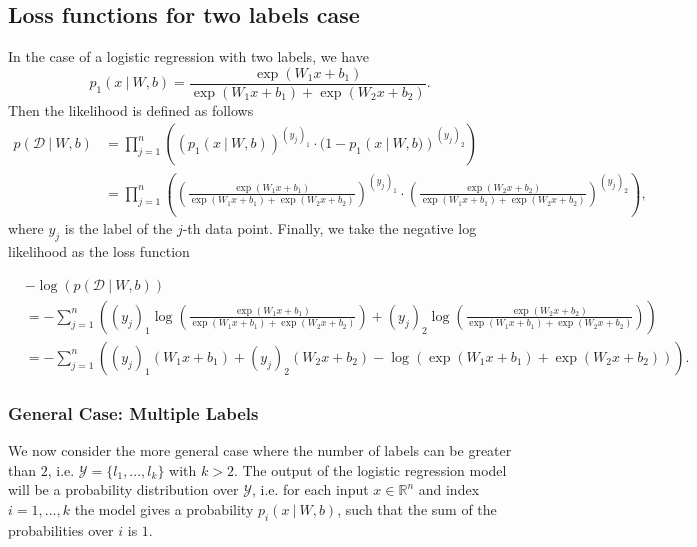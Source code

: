 \subsection*{Loss functions for two labels case}
In the case of a logistic regression with two labels, we have
\begin{equation}
p_1(x~|~W,b)  = \frac{\exp(W_{1}x + b_1)}{\exp(W_{1}x + b_1)+\exp(W_{2}x + b_2)}.
\end{equation}
Then the likelihood is defined as follows
\begin{equation}
\begin{split}
p(\mathcal{D}~|~W, b) &= 
\prod_{j = 1}^n 
\left(
\left(p_1(x~|~W,b)\right)^{(y_j)_1}\cdot(1-p_1\left(x~|~W,b)\right)^{(y_j)_2}
\right)
\\
&=
\prod_{j = 1}^n 
\left(
\left(
\frac{\exp(W_{1}x + b_1)}{\exp(W_{1}x + b_1)+\exp(W_{2}x + b_2)}
\right)^{(y_j)_1}
\cdot
\left(
\frac{\exp(W_{2}x + b_2)}{\exp(W_{1}x + b_1)+\exp(W_{2}x + b_2)} 
\right)^{(y_j)_2}
\right),
\end{split}
\end{equation}
where $y_j$ is the label of the $j$-th data point. Finally, we take the negative log likelihood as the loss function

\begin{equation}\label{LossTwoLabels}
\begin{aligned}
&-\log(p(\mathcal{D}~|~W, b)) \\
&= 
-\displaystyle\sum_{j=1}^n
\left(
{(y_j)_1}
\log\left(
\frac{\exp(W_{1}x + b_1)}{\exp(W_{1}x + b_1)+\exp(W_{2}x + b_2)}
\right)
+
(y_j)_2\log\left(
\frac{\exp(W_{2}x + b_2)}{\exp(W_{1}x + b_1)+\exp(W_{2}x + b_2)}
\right)
\right)
\\
&=
-\displaystyle\sum_{j=1}^n \left(
(y_j)_1(W_{1}x + b_1)+(y_j)_2(W_{2}x + b_2)-\log\left(\exp(W_{1}x + b_1)+\exp(W_{2}x + b_2)\right)
\right).
\end{aligned}
\end{equation}




\subsubsection{General Case: Multiple Labels}
We now consider the more general case where the number of labels can be greater than $2$, i.e. $\mathcal{Y} = \{l_1,...,l_k\}$
with $k > 2$. The output of the logistic regression model will be a probability distribution over $\mathcal{Y}$, i.e. for each
input $x\in \mathbb{R}^n$ and index $i = 1,...,k$ the model gives a probability $p_i(x~|~W,b)$, such that the 
sum of the probabilities over $i$ is $1$. 

